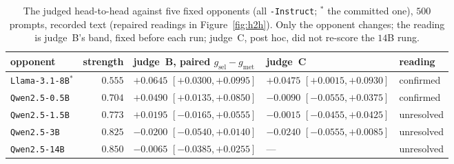 \begin{table}[ht]
\centering\footnotesize
\caption{The judged head-to-head against five fixed opponents (all \texttt{-Instruct}; $^*$ the committed
one), $500$ prompts, recorded text (repaired readings in Figure~\ref{fig:h2h}). Only the opponent changes;
the reading is judge~B's band, fixed before each run; judge~C, post hoc, did not re-score the $14$B rung.}
\label{tab:opponentladder}
\setlength{\tabcolsep}{4pt}
\begin{tabular}{@{}lrlll@{}}
\toprule
opponent & strength & judge~B, paired $g_{\mathrm{sel}} - g_{\mathrm{met}}$ & judge~C & reading \\
\midrule
\texttt{Llama-3.1-8B}$^*$ & $0.555$ & $+0.0645$ $[+0.0300, +0.0995]$ & $+0.0475$ $[+0.0015, +0.0930]$ & confirmed \\
\texttt{Qwen2.5-0.5B} & $0.704$ & $+0.0490$ $[+0.0135, +0.0850]$ & $-0.0090$ $[-0.0555, +0.0375]$ & confirmed \\
\texttt{Qwen2.5-1.5B} & $0.773$ & $+0.0195$ $[-0.0165, +0.0555]$ & $-0.0015$ $[-0.0455, +0.0425]$ & unresolved \\
\texttt{Qwen2.5-3B} & $0.825$ & $-0.0200$ $[-0.0540, +0.0140]$ & $-0.0240$ $[-0.0555, +0.0085]$ & unresolved \\
\texttt{Qwen2.5-14B} & $0.850$ & $-0.0065$ $[-0.0385, +0.0255]$ & --- & unresolved \\
\bottomrule
\end{tabular}
\end{table}

